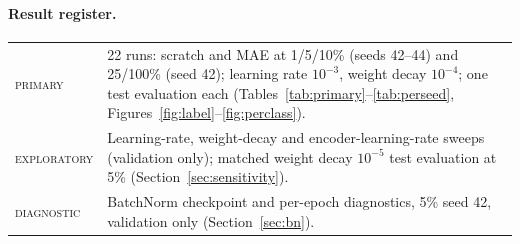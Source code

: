 \documentclass[11pt,a4paper]{article}
\newcommand{\primary}{\textsc{primary}}
\newcommand{\exploratory}{\textsc{exploratory}}
\newcommand{\diagnostic}{\textsc{diagnostic}}
\begin{document}
\paragraph{Result register.}
\begin{center}\small
\begin{tabularx}{\linewidth}{lX}
\toprule
\primary & 22 runs: scratch and MAE at 1/5/10\% (seeds 42--44) and 25/100\% (seed 42); learning rate $10^{-3}$, weight decay $10^{-4}$; one test evaluation each (Tables~\ref{tab:primary}--\ref{tab:perseed}, Figures~\ref{fig:label}--\ref{fig:perclass}).\\
\exploratory & Learning-rate, weight-decay and encoder-learning-rate sweeps (validation only); matched weight decay $10^{-5}$ test evaluation at 5\% (Section~\ref{sec:sensitivity}).\\
\diagnostic & BatchNorm checkpoint and per-epoch diagnostics, 5\% seed 42, validation only (Section~\ref{sec:bn}).\\
\bottomrule
\end{tabularx}
\end{center}



\end{document}
